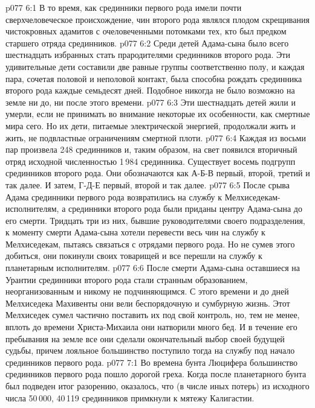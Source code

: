 \vs p077 6:1 В то время, как срединники первого рода имели почти сверхчеловеческое происхождение, чин второго рода являлся плодом скрещивания чистокровных адамитов с очеловеченными потомками тех, кто был предком старшего отряда срединников.
\vs p077 6:2 Среди детей Адама\hyp{}сына было всего шестнадцать избранных стать прародителями срединников второго рода. Эти удивительные дети составили две равные группы соответственно полу, и каждая пара, сочетая половой и неполовой контакт, была способна рождать срединника второго рода каждые семьдесят дней. Подобное никогда не было возможно на земле ни до, ни после этого времени.
\vs p077 6:3 Эти шестнадцать детей жили и умерли, если не принимать во внимание некоторые их особенности, как смертные мира сего. Но их дети, питаемые электрической энергией, продолжали жить и жить, не подвластные ограничениям смертной плоти.
\vs p077 6:4 Каждая из восьми пар произвела 248 срединников и, таким образом, на свет появился вторичный отряд исходной численностью 1\,984 срединника. Существует восемь подгрупп срединников второго рода. Они обозначаются как А\hyp{}Б\hyp{}В первый, второй, третий и так далее. И затем, Г\hyp{}Д\hyp{}Е первый, второй и так далее.
\vs p077 6:5 \pc После срыва Адама срединники первого рода возвратились на службу к Мелхиседекам\hyp{}исполнителям, а срединники второго рода были приданы центру Адама\hyp{}сына до его смерти. Тридцать три из них, бывшие руководителями своего подразделения, к моменту смерти Адама\hyp{}сына хотели перевести весь чин на службу к Мелхиседекам, пытаясь связаться с отрядами первого рода. Но не сумев этого добиться, они покинули своих товарищей и все перешли на службу к планетарным исполнителям.
\vs p077 6:6 После смерти Адама\hyp{}сына оставшиеся на Урантии срединники второго рода стали странным образованием, неорганизованным и никому не подчиняющимся. С этого времени и до дней Мелхиседека Махивенты они вели беспорядочную и сумбурную жизнь. Этот Мелхиседек сумел частично поставить их под свой контроль, но, тем не менее, вплоть до времени Христа\hyp{}Михаила они натворили много бед. И в течение его пребывания на земле все они сделали окончательный выбор своей будущей судьбы, причем лояльное большинство поступило тогда на службу под начало срединников первого рода.
\vs p077 7:1 Во времена бунта Люцифера большинство срединников первого рода пошло дорогой греха. Когда после планетарного бунта был подведен итог разорению, оказалось, что (в числе иных потерь) из исходного числа 50\,000, 40\,119 срединников примкнули к мятежу Калигастии.
